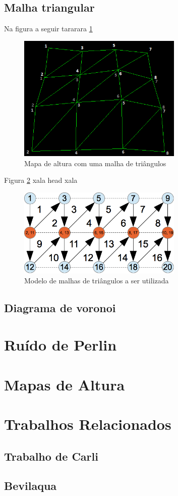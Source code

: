 \subsection{Malha triangular}
Na figura a seguir tararara \ref{fig:triangle_strips}
\begin{figure}[H]
    \centering
    \includegraphics[width=0.7\textwidth]{figuras/triangle_strips.png}
    \caption{Mapa de altura com uma malha de triângulos \cite{trainglestripheightmap}}
    \label{fig:triangle_strips}
\end{figure}
Figura \ref{fig:vbo} xala head xala
\begin{figure}[H]
    \centering
    \includegraphics[width=0.7\textwidth]{figuras/vbo.png}
    \caption{Modelo de malhas de triângulos a ser utilizada \cite{androidtrianglestrip}}
    \label{fig:vbo}
\end{figure}


\subsection{Diagrama de voronoi}

\section{Ruído de Perlin}

\section{Mapas de Altura}

\section{Trabalhos Relacionados}

\subsection{Trabalho de Carli}

\subsection{Bevilaqua}